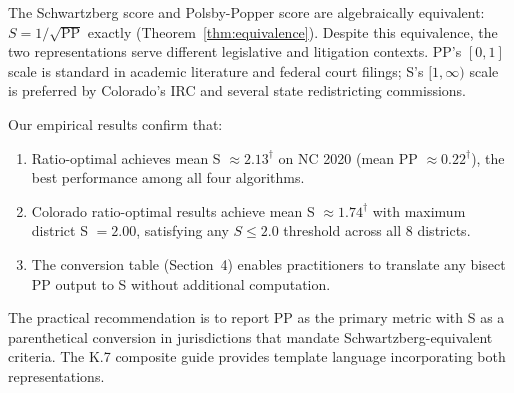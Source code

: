 The Schwartzberg score and Polsby-Popper score are algebraically equivalent:
$S = 1/\sqrt{\text{PP}}$ exactly (Theorem~\ref{thm:equivalence}).
Despite this equivalence, the two representations serve different legislative
and litigation contexts.
PP's $[0,1]$ scale is standard in academic literature and federal court filings;
S's $[1,\infty)$ scale is preferred by Colorado's IRC and several state
redistricting commissions.

Our empirical results confirm that:
\begin{enumerate}
  \item Ratio-optimal achieves mean S $\approx 2.13^\dagger$ on NC 2020
    (mean PP $\approx 0.22^\dagger$), the best performance among all four algorithms.
  \item Colorado ratio-optimal results achieve mean S $\approx 1.74^\dagger$
    with maximum district S $= 2.00$, satisfying any $S \leq 2.0$ threshold
    across all 8 districts.
  \item The conversion table (Section~4) enables practitioners to translate
    any bisect PP output to S without additional computation.
\end{enumerate}

The practical recommendation is to report PP as the primary metric with S
as a parenthetical conversion in jurisdictions that mandate Schwartzberg-equivalent
criteria.
The K.7 composite guide provides template language incorporating both representations.

